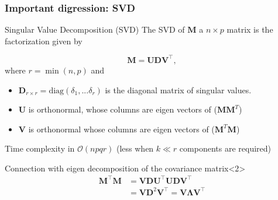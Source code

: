 \documentclass{beamer}\usepackage[]{graphicx}\usepackage[]{color}
\begin{document}
\begin{frame}
  \frametitle{Important digression: SVD}

  \begin{block}{Singular Value Decomposition (SVD)}
    The SVD of $\mathbf{M}$ a $n\times p$ matrix is the factorization given by
    
    \[ \mathbf{M} =\mathbf{U}\mathbf{D}\mathbf{V}^\top,\]
    where $r = \min(n,p)$ and
    \begin{itemize}
      \item \(\mathbf{D}_{r \times r} = \text{diag}(\delta_1, ...\delta_r)\) is the diagonal matrix of singular values.
      \item \(\mathbf{U}\) is orthonormal, whose columns are eigen vectors of (\(\mathbf{M}\mathbf{M}^T\))
      \item \(\mathbf{V}\) is orthonormal whose columns are eigen vectors of (\(\mathbf{M}^T\mathbf{M}\))
    \end{itemize}
    {\small \rsa Time complexity in $\mathcal{O}(n p q r)$ (less when $k\ll r$ components are required)}
  \end{block}

  \vfill
  
  \begin{block}{Connection with eigen decomposition of the covariance matrix}<2>
    \vspace{-.5cm}
    \begin{align*}
      \mathbf{M}^\top\mathbf{M} & = \mathbf{V} \mathbf{D} \mathbf{U}^\top  \mathbf{U} \mathbf{D} \mathbf{V}^\top \\
        & = \mathbf{V} \mathbf{D}^2 \mathbf{V}^\top  = \mathbf{V} \boldsymbol{\Lambda} \mathbf{V}^\top\\
    \end{align*}
  \end{block}

\end{frame}
\end{document}
